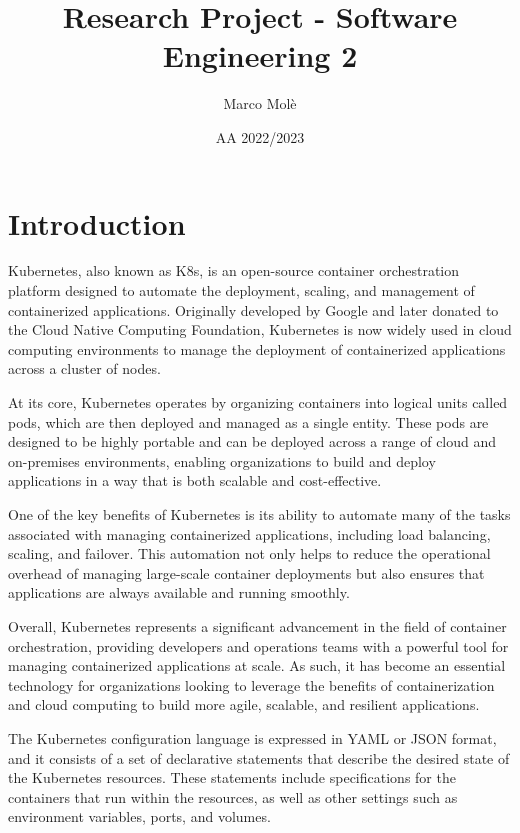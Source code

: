 \documentclass[
  11pt,
]{article}
\title{Research Project - Software Engineering 2}
\author{Marco Molè}
\date{AA 2022/2023}
\begin{document}
\maketitle

{
\setcounter{tocdepth}{3}
\tableofcontents
}
\hypertarget{introduction}{%
\section{Introduction}\label{introduction}}

Kubernetes, also known as K8s, is an open-source container orchestration
platform designed to automate the deployment, scaling, and management of
containerized applications. Originally developed by Google and later
donated to the Cloud Native Computing Foundation, Kubernetes is now
widely used in cloud computing environments to manage the deployment of
containerized applications across a cluster of nodes.

At its core, Kubernetes operates by organizing containers into logical
units called pods, which are then deployed and managed as a single
entity. These pods are designed to be highly portable and can be
deployed across a range of cloud and on-premises environments, enabling
organizations to build and deploy applications in a way that is both
scalable and cost-effective.

One of the key benefits of Kubernetes is its ability to automate many of
the tasks associated with managing containerized applications, including
load balancing, scaling, and failover. This automation not only helps to
reduce the operational overhead of managing large-scale container
deployments but also ensures that applications are always available and
running smoothly.

Overall, Kubernetes represents a significant advancement in the field of
container orchestration, providing developers and operations teams with
a powerful tool for managing containerized applications at scale. As
such, it has become an essential technology for organizations looking to
leverage the benefits of containerization and cloud computing to build
more agile, scalable, and resilient applications.

The Kubernetes configuration language is expressed in YAML or JSON
format, and it consists of a set of declarative statements that describe
the desired state of the Kubernetes resources. These statements include
specifications for the containers that run within the resources, as well
as other settings such as environment variables, ports, and volumes.
\end{document}
